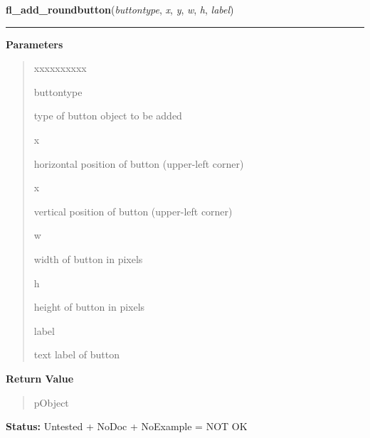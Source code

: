     \label{xformslib:library:fl_add_roundbutton}

    \vspace{0.5ex}

\hspace{.8\funcindent}\begin{boxedminipage}{\funcwidth}

    \raggedright \textbf{fl\_add\_roundbutton}(\textit{buttontype}, \textit{x}, \textit{y}, \textit{w}, \textit{h}, \textit{label})

    \vspace{-1.5ex}

    \rule{\textwidth}{0.5\fboxrule}
\setlength{\parskip}{2ex}
\setlength{\parskip}{1ex}
      \textbf{Parameters}
      \vspace{-1ex}

      \begin{quote}
        \begin{Ventry}{xxxxxxxxxx}

          \item[buttontype]

          type of button object to be added

          \item[x]

          horizontal position of button (upper-left corner)

          \item[x]

          vertical position of button (upper-left corner)

          \item[w]

          width of button in pixels

          \item[h]

          height of button in pixels

          \item[label]

          text label of button

        \end{Ventry}

      \end{quote}

      \textbf{Return Value}
    \vspace{-1ex}

      \begin{quote}
      pObject

      \end{quote}

\textbf{Status:} Untested + NoDoc + NoExample = NOT OK



    \end{boxedminipage}

